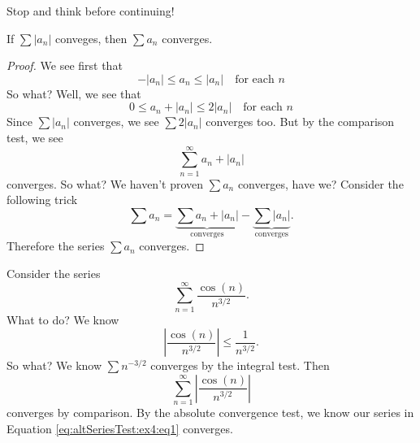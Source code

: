 Stop and think before continuing!

If $\sum |a_{n}|$ conveges, then $\sum a_{n}$ converges.

\begin{proof}
We see first that 
\begin{equation}
-|a_{n}|\leq a_{n}\leq|a_{n}|\quad\mbox{for each }n
\end{equation}
So what? Well, we see that
\begin{equation}
0\leq a_{n}+|a_{n}|\leq2|a_{n}|\quad\mbox{for each }n
\end{equation}
Since $\sum|a_{n}|$ converges, we see $\sum2|a_{n}|$ converges
too. But by the comparison test, we see
\begin{equation}
\sum^{\infty}_{n=1}a_{n}+|a_{n}|
\end{equation}
converges. So what? We haven't proven $\sum a_{n}$ converges,
have we? Consider the following trick
\begin{equation}
\sum a_{n} = \underbrace{\sum
  a_{n}+|a_{n}|}_{\text{converges}}-\underbrace{\sum
  |a_{n}|}_{\text{converges}}.
\end{equation}
Therefore the series $\sum a_{n}$ converges.
\end{proof}
\begin{example}
Consider the series
\begin{equation}\label{eq:altSeriesTest:ex4:eq1}
\sum^{\infty}_{n=1}\frac{\cos(n)}{n^{3/2}}.
\end{equation}
What to do? We know
\begin{equation}
\left|\frac{\cos(n)}{n^{3/2}}\right|\leq\frac{1}{n^{3/2}}.
\end{equation}
So what? We know $\sum n^{-3/2}$ converges by the integral
test. Then
\begin{equation}
\sum^{\infty}_{n=1}\left|\frac{\cos(n)}{n^{3/2}}\right|
\end{equation}
converges by comparison. By the absolute convergence test, we know
our series in Equation \eqref{eq:altSeriesTest:ex4:eq1} converges.
\end{example}


%


